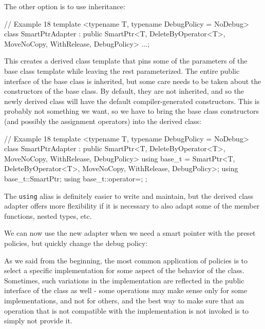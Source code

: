 The other option is to use inheritance:

\begin{code}
// Example 18
template <typename T, typename DebugPolicy = NoDebug>
class SmartPtrAdapter : public SmartPtr<T,
  DeleteByOperator<T>, MoveNoCopy,
  WithRelease, DebugPolicy>
{...};
\end{code}

This creates a derived class template that pins some of the parameters of the base class template while leaving the rest parameterized. The entire public interface of the base class is inherited, but some care needs to be taken about the constructors of the base class. By default, they are not inherited, and so the newly derived class will have the default compiler-generated constructors. This is probably not something we want, so we have to bring the base class constructors (and possibly the assignment operators) into the derived class:

\begin{code}
// Example 18
template <typename T, typename DebugPolicy = NoDebug>
class SmartPtrAdapter : public SmartPtr<T,
  DeleteByOperator<T>, MoveNoCopy,
  WithRelease, DebugPolicy>
{
  using base_t = SmartPtr<T, DeleteByOperator<T>,
    MoveNoCopy, WithRelease, DebugPolicy>;
  using base_t::SmartPtr;
  using base_t::operator=;
};
\end{code}

The \texttt{using} alias is definitely easier to write and maintain, but the derived class adapter offers more flexibility if it is necessary to also adapt some of the member functions, nested types, etc.

We can now use the new adapter when we need a smart pointer with the preset policies, but quickly change the debug policy:

\begin{code}
SmartPtrAdapter<C, Debug> p1{new C); // Debug pointer
SmartPtrAdapter<C> p2{new C); // Non-debug pointer
\end{code}

As we said from the beginning, the most common application of policies is to select a specific implementation for some aspect of the behavior of the class. Sometimes, such variations in the implementation are reflected in the public interface of the class as well - some operations may make sense only for some implementations, and not for others, and the best way to make sure that an operation that is not compatible with the implementation is not invoked is to simply not provide it.

